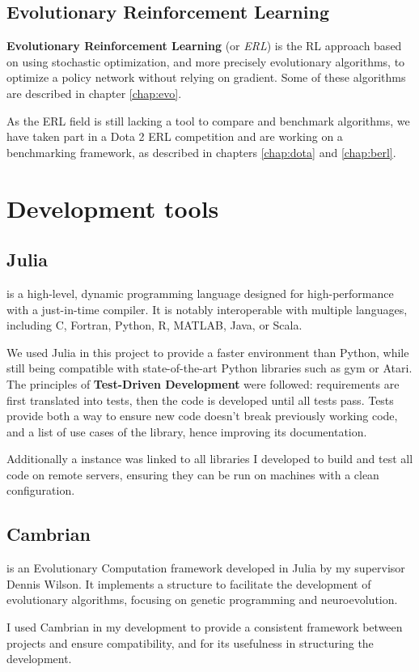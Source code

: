 \subsection{Evolutionary Reinforcement Learning}
\label{sec:ERL}

\textbf{Evolutionary Reinforcement Learning} (or \textit{ERL}) is the RL approach based on using stochastic optimization, and more precisely evolutionary algorithms, to optimize a policy network without relying on gradient. Some of these algorithms are described in chapter \ref{chap:evo}.

As the ERL field is still lacking a tool to compare and benchmark algorithms, we have taken part in a Dota 2 ERL competition and are working on a benchmarking framework, as described in chapters \ref{chap:dota} and \ref{chap:berl}.

\section{Development tools}
\subsection{Julia}
    
 is a high-level, dynamic programming language designed for high-performance with a just-in-time compiler. It is notably interoperable with multiple languages, including C, Fortran, Python, R, MATLAB, Java, or Scala. \cite{julia-lang}

We used Julia in this project to provide a faster environment than Python, while still being compatible with state-of-the-art Python libraries such as gym or Atari.
\\

The principles of \textbf{Test-Driven Development} were followed: requirements are first translated into tests, then the code is developed until all tests pass. Tests provide both a way to ensure new code doesn't break previously working code, and a list of use cases of the library, hence improving its documentation.

Additionally a  instance was linked to all libraries I developed to build and test all code on remote servers, ensuring they can be run on machines with a clean configuration. 

\subsection{Cambrian}

 is an Evolutionary Computation framework developed in Julia by my supervisor Dennis Wilson. It implements a structure to facilitate the development of evolutionary algorithms, focusing on genetic programming and neuroevolution. 

I used Cambrian in my development to provide a consistent framework between projects and ensure compatibility, and for its usefulness in structuring the development.

